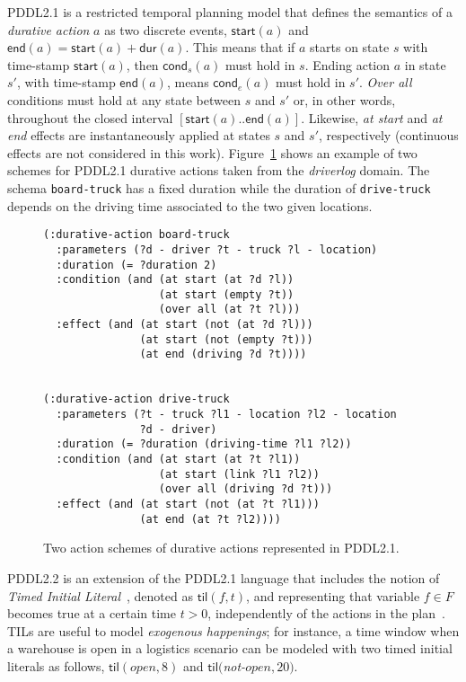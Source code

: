 \documentclass{ecai}
\newcommand{\cond}{\mathsf{cond}}  %
\newcommand{\dur}{\mathsf{dur}}    %
\newcommand{\start}{\mathsf{start}}%
\newcommand{\en}{\mathsf{end}}     %
\newcommand{\til}{\mathsf{til}}    %
\begin{document}
PDDL2.1 is a restricted temporal planning model that defines the semantics of a {\em durative action} $a$ as two discrete events, $\start(a)$ and $\en(a)=\start(a)+\dur(a)$. This means that if $a$ starts on state $s$ with time-stamp $\start(a)$, then $\cond_s(a)$ must hold in $s$. Ending action $a$ in state $s'$, with time-stamp $\en(a)$, means $\cond_e(a)$ must hold in $s'$. {\em Over all} conditions must hold at any state between $s$ and $s'$ or, in other words, throughout the closed interval $[\start(a)..\en(a)]$. Likewise, {\em at start} and {\em at end} effects are instantaneously applied at states $s$ and $s'$, respectively (continuous effects are not considered in this work). Figure~\ref{fig:exampleactions2} shows an example of two schemes for PDDL2.1 durative actions taken from the {\em driverlog} domain. The schema \texttt{board-truck} has a fixed duration while the duration of \texttt{drive-truck} depends on the driving time associated to the two given locations.

\begin{figure}
\begin{scriptsize}    
\begin{verbatim}
(:durative-action board-truck
  :parameters (?d - driver ?t - truck ?l - location)
  :duration (= ?duration 2)
  :condition (and (at start (at ?d ?l)) 
                  (at start (empty ?t))
                  (over all (at ?t ?l)))
  :effect (and (at start (not (at ?d ?l))) 
               (at start (not (empty ?t)))
               (at end (driving ?d ?t))))


(:durative-action drive-truck
  :parameters (?t - truck ?l1 - location ?l2 - location 
               ?d - driver)
  :duration (= ?duration (driving-time ?l1 ?l2))
  :condition (and (at start (at ?t ?l1)) 
                  (at start (link ?l1 ?l2))
                  (over all (driving ?d ?t)))
  :effect (and (at start (not (at ?t ?l1))) 
               (at end (at ?t ?l2))))
\end{verbatim}
\end{scriptsize}    
\caption{Two action schemes of durative actions represented in PDDL2.1.}
\label{fig:exampleactions2}
\end{figure}

PDDL2.2 is an extension of the PDDL2.1 language that includes the notion of {\em Timed Initial Literal}~\cite{hoffmann2005}, denoted as $\til(f,t)$, and representing that variable $f\in F$ becomes true at a certain time $t>0$, independently of the actions in the plan~\cite{Edelkamp04}. TILs are useful to model {\em exogenous happenings}; for instance, a time window when a warehouse is open in a logistics scenario can be modeled with two timed initial literals as follows, $\til(open,8)$ and $\til($\textit{not-}$open,20)$.
\end{document}
